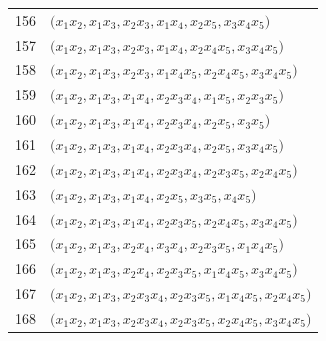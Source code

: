 {\begin{longtable}{@{}r>{\raggedright\arraybackslash}p{}@{}}
156 & \(\bigl(x_{1}x_{2},\allowbreak x_{1}x_{3},\allowbreak x_{2}x_{3},\allowbreak x_{1}x_{4},\allowbreak x_{2}x_{5},\allowbreak x_{3}x_{4}x_{5}\bigr)\) \\
157 & \(\bigl(x_{1}x_{2},\allowbreak x_{1}x_{3},\allowbreak x_{2}x_{3},\allowbreak x_{1}x_{4},\allowbreak x_{2}x_{4}x_{5},\allowbreak x_{3}x_{4}x_{5}\bigr)\) \\
158 & \(\bigl(x_{1}x_{2},\allowbreak x_{1}x_{3},\allowbreak x_{2}x_{3},\allowbreak x_{1}x_{4}x_{5},\allowbreak x_{2}x_{4}x_{5},\allowbreak x_{3}x_{4}x_{5}\bigr)\) \\
159 & \(\bigl(x_{1}x_{2},\allowbreak x_{1}x_{3},\allowbreak x_{1}x_{4},\allowbreak x_{2}x_{3}x_{4},\allowbreak x_{1}x_{5},\allowbreak x_{2}x_{3}x_{5}\bigr)\) \\
160 & \(\bigl(x_{1}x_{2},\allowbreak x_{1}x_{3},\allowbreak x_{1}x_{4},\allowbreak x_{2}x_{3}x_{4},\allowbreak x_{2}x_{5},\allowbreak x_{3}x_{5}\bigr)\) \\
161 & \(\bigl(x_{1}x_{2},\allowbreak x_{1}x_{3},\allowbreak x_{1}x_{4},\allowbreak x_{2}x_{3}x_{4},\allowbreak x_{2}x_{5},\allowbreak x_{3}x_{4}x_{5}\bigr)\) \\
162 & \(\bigl(x_{1}x_{2},\allowbreak x_{1}x_{3},\allowbreak x_{1}x_{4},\allowbreak x_{2}x_{3}x_{4},\allowbreak x_{2}x_{3}x_{5},\allowbreak x_{2}x_{4}x_{5}\bigr)\) \\
163 & \(\bigl(x_{1}x_{2},\allowbreak x_{1}x_{3},\allowbreak x_{1}x_{4},\allowbreak x_{2}x_{5},\allowbreak x_{3}x_{5},\allowbreak x_{4}x_{5}\bigr)\) \\
164 & \(\bigl(x_{1}x_{2},\allowbreak x_{1}x_{3},\allowbreak x_{1}x_{4},\allowbreak x_{2}x_{3}x_{5},\allowbreak x_{2}x_{4}x_{5},\allowbreak x_{3}x_{4}x_{5}\bigr)\) \\
165 & \(\bigl(x_{1}x_{2},\allowbreak x_{1}x_{3},\allowbreak x_{2}x_{4},\allowbreak x_{3}x_{4},\allowbreak x_{2}x_{3}x_{5},\allowbreak x_{1}x_{4}x_{5}\bigr)\) \\
166 & \(\bigl(x_{1}x_{2},\allowbreak x_{1}x_{3},\allowbreak x_{2}x_{4},\allowbreak x_{2}x_{3}x_{5},\allowbreak x_{1}x_{4}x_{5},\allowbreak x_{3}x_{4}x_{5}\bigr)\) \\
167 & \(\bigl(x_{1}x_{2},\allowbreak x_{1}x_{3},\allowbreak x_{2}x_{3}x_{4},\allowbreak x_{2}x_{3}x_{5},\allowbreak x_{1}x_{4}x_{5},\allowbreak x_{2}x_{4}x_{5}\bigr)\) \\
168 & \(\bigl(x_{1}x_{2},\allowbreak x_{1}x_{3},\allowbreak x_{2}x_{3}x_{4},\allowbreak x_{2}x_{3}x_{5},\allowbreak x_{2}x_{4}x_{5},\allowbreak x_{3}x_{4}x_{5}\bigr)\) \\

\end{longtable}}
